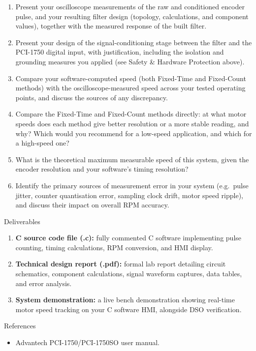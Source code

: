 \begin{reportq}
  \begin{enumerate}
    \item Present your oscilloscope measurements of the raw and conditioned encoder pulse, and your resulting filter design (topology, calculations, and component values), together with the measured response of the built filter.
    \item Present your design of the signal-conditioning stage between the filter and the PCI-1750 digital input, with justification, including the isolation and grounding measures you applied (see Safety \& Hardware Protection above).
    \item Compare your software-computed speed (both Fixed-Time and Fixed-Count methods) with the oscilloscope-measured speed across your tested operating points, and discuss the sources of any discrepancy.
    \item Compare the Fixed-Time and Fixed-Count methods directly: at what motor speeds does each method give better resolution or a more stable reading, and why? Which would you recommend for a low-speed application, and which for a high-speed one?
    \item What is the theoretical maximum measurable speed of this system, given the encoder resolution and your software's timing resolution?
    \item Identify the primary sources of measurement error in your system (e.g.\ pulse jitter, counter quantisation error, sampling clock drift, motor speed ripple), and discuss their impact on overall RPM accuracy.
  \end{enumerate}
\end{reportq}

\begin{labsection}{Deliverables}{}
  \begin{enumerate}
    \item \textbf{C source code file (.c):} fully commented C software implementing pulse counting, timing calculations, RPM conversion, and HMI display.
    \item \textbf{Technical design report (.pdf):} formal lab report detailing circuit schematics, component calculations, signal waveform captures, data tables, and error analysis.
    \item \textbf{System demonstration:} a live bench demonstration showing real-time motor speed tracking on your C software HMI, alongside DSO verification.
  \end{enumerate}
\end{labsection}

\begin{labsection}{References}{}
  \begin{itemize}
    \item Advantech PCI-1750/PCI-1750SO user manual.
  \end{itemize}
\end{labsection}
